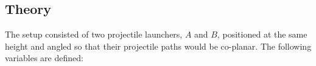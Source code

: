 \documentclass[12pt]{article}
\begin{document}





    
        
        
        








\subsection{Theory}

The setup consisted of two projectile launchers, \(A\) and \(B\), positioned at the same height and angled so that their projectile paths would be co-planar. The following variables are defined:
\end{document}
